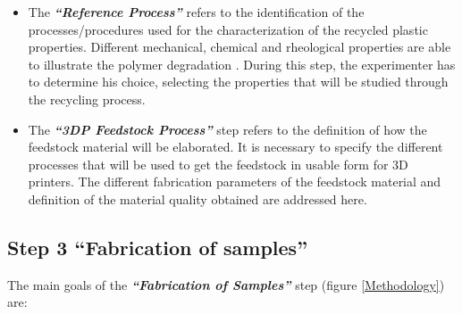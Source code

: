 \begin{itemize}[noitemsep]
	\item The \textbf{\textit{``Reference Process''}} refers to the identification of the processes/procedures used for the characterization of the recycled plastic properties.
	Different mechanical, chemical and rheological properties are able to illustrate the polymer degradation \parencite{Vilaplana2007, Vilaplana2008}.
	During this step, the experimenter has to determine his choice, selecting the properties that will be studied through the recycling process.
	
	\item	The \textbf{\textit{``3DP Feedstock Process''}} step refers to the definition of how the feedstock material will be elaborated.
	It is necessary  to specify the different processes that will be used to get the feedstock in usable form for 3D printers. 	
	The different  fabrication parameters of the feedstock material and definition of the material quality obtained are addressed here.		
\end{itemize}



\subsection{ Step 3 ``Fabrication of samples''}
\label{step.fabrication.of.samples}

The main goals of the  \textit{\textbf{``Fabrication of Samples''}} step (figure \ref{Methodology})  are:  


